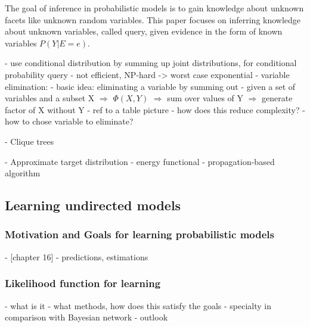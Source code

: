 The goal of inference in probabilistic models is to gain knowledge about unknown facets like unknown random variables. This paper focuses on inferring knowledge about unknown variables, called query, given evidence in the form of known variables $P(Y|E=e)$.

- use conditional distribution by summing up joint distributions, for conditional probability query
- not efficient, NP-hard -> worst case exponential
- variable elimination:
 - basic idea: eliminating a variable by summing out
 - given a set of variables and a subset X $\Rightarrow$ $\Phi(X,Y)$ $\Rightarrow$ sum over values of Y $\Rightarrow$ generate factor of X without Y
 - ref to a table picture %
 - how does this reduce complexity?
 - how to chose variable to eliminate?


- Clique trees %

- Approximate target distribution %
 - energy functional %
 - propagation-based algorithm %


\subsection{Learning undirected models}

\subsubsection{Motivation and Goals for learning probabilistic models}
- [chapter 16]
- predictions, estimations

\subsubsection{Likelihood function for learning}

- what is it
- what methods, how does this satisfy the goals
- specialty in comparison with Bayesian network
- outlook